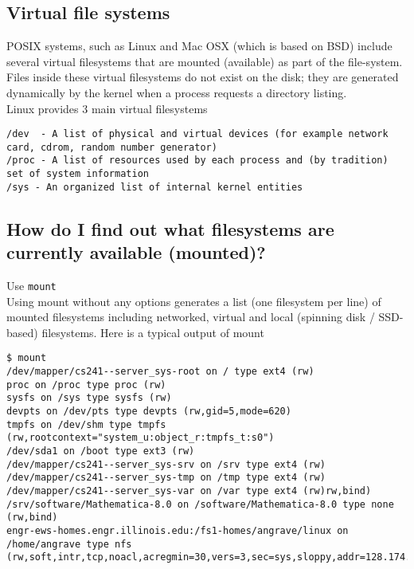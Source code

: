 \subsection{Virtual file systems}\label{virtual-file-systems}

POSIX systems, such as Linux and Mac OSX (which is based on BSD) include
several virtual filesystems that are mounted (available) as part of the
file-system. Files inside these virtual filesystems do not exist on the
disk; they are generated dynamically by the kernel when a process
requests a directory listing.\\Linux provides 3 main virtual filesystems

\begin{verbatim}
/dev  - A list of physical and virtual devices (for example network card, cdrom, random number generator)
/proc - A list of resources used by each process and (by tradition) set of system information
/sys - An organized list of internal kernel entities
\end{verbatim}

\subsection{How do I find out what filesystems are currently available
(mounted)?}\label{how-do-i-find-out-what-filesystems-are-currently-available-mounted}

Use \texttt{mount}\\Using mount without any options generates a list
(one filesystem per line) of mounted filesystems including networked,
virtual and local (spinning disk / SSD-based) filesystems. Here is a
typical output of mount

\begin{verbatim}
$ mount
/dev/mapper/cs241--server_sys-root on / type ext4 (rw)
proc on /proc type proc (rw)
sysfs on /sys type sysfs (rw)
devpts on /dev/pts type devpts (rw,gid=5,mode=620)
tmpfs on /dev/shm type tmpfs (rw,rootcontext="system_u:object_r:tmpfs_t:s0")
/dev/sda1 on /boot type ext3 (rw)
/dev/mapper/cs241--server_sys-srv on /srv type ext4 (rw)
/dev/mapper/cs241--server_sys-tmp on /tmp type ext4 (rw)
/dev/mapper/cs241--server_sys-var on /var type ext4 (rw)rw,bind)
/srv/software/Mathematica-8.0 on /software/Mathematica-8.0 type none (rw,bind)
engr-ews-homes.engr.illinois.edu:/fs1-homes/angrave/linux on /home/angrave type nfs (rw,soft,intr,tcp,noacl,acregmin=30,vers=3,sec=sys,sloppy,addr=128.174.252.102)
\end{verbatim}


